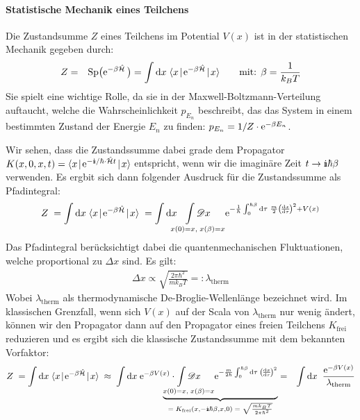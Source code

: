 \paragraph{Statistische Mechanik eines Teilchens}
Die Zustandsumme $Z$ eines Teilchens im Potential $V(x)$ ist in der statistischen Mechanik gegeben durch: 
\begin{eqnarray*}
	Z &=& \Sp\big(\e^{-\beta\hat{\ham}}\,\big) = \int \mathrm{d}x\; \bracket{x}{\e^{-\beta\hat{\ham}}}{x} \qquad \text{mit: } \beta=\frac{1}{k_BT}
\end{eqnarray*}
Sie spielt eine wichtige Rolle, da sie in der Maxwell-Boltzmann-Verteilung auftaucht, welche die Wahrscheinlichkeit $p_{E_n}$ beschreibt, das das System in einem bestimmten Zustand der Energie $E_n$ zu finden: $p_{E_n}=1/Z\cdot\mathrm{e}^{-\beta E_n}$. 

Wir sehen, dass die Zustandssumme dabei grade dem Propagator $K(x,0,x,t)=\bracket{x}{\e^{-\I/\hbar\cdot \hat{\ham}t}}{x}$ entspricht, wenn wir die imaginäre Zeit $t\to \I\hbar \beta$ verwenden. Es ergbit sich dann folgender Ausdruck für die Zustandssumme als Pfadintegral: 
\begin{eqnarray*}
	Z \;= \int\mathrm{d}x\;\bracket{x}{\e^{-\beta\hat{\ham}}}{x} \;= \int \mathrm{d}x\!\!\!\!\underset{x(0)=x,\;x(\beta)=x}{\int \mathscr{D}x} \e^{-\frac{1}{\hbar}\int_0^{\hbar\beta}\mathrm{d}\tau\; \frac{m}{2}\left(\!\frac{\mathrm{d}x}{\mathrm{d}\tau}\!\right)^2+V(x)}
\end{eqnarray*}
Das Pfadintegral berücksichtigt dabei die quantenmechanischen Fluktuationen, welche proportional zu $\Delta x$  sind. Es gilt: 
\begin{eqnarray*}
	\Delta x \propto \sqrt{\frac{2\pi \hbar^2}{m k_B T}} =: \lambda_{\text{therm}}
\end{eqnarray*}
Wobei $\lambda_{\text{therm}}$ als thermodynamische De-Broglie-Wellenlänge bezeichnet wird. Im klassischen Grenzfall, wenn sich $V(x)$ auf der Scala von $\lambda_{\text{therm}}$ nur wenig ändert, können wir den Propagator dann auf den Propagator eines freien Teilchens $K_{\text{frei}}$ reduzieren und es ergibt sich die klassische Zustandssumme mit dem bekannten Vorfaktor: 
\begin{eqnarray*}
	Z \;= \int\mathrm{d}x\;\bracket{x}{\e^{-\beta\hat{\ham}}}{x} \;\approx\; \int \mathrm{d}x\;\e^{-\beta V(x)}\cdot\!\!\!\!\!\!\!\!\! \underbrace{\underset{x(0)=x,\;x(\beta)=x}{\int \mathscr{D}x} \e^{-\frac{m}{2\hbar}\int_0^{\hbar\beta}\mathrm{d}\tau\; \left(\!\frac{\mathrm{d}x}{\mathrm{d}\tau}\!\right)^2}}_{=\; K_{\text{frei}}(x,-\I\hbar\beta,x,0)\;=\;\sqrt{\frac{mk_BT}{2\pi\hbar^2}}} &=& \int \mathrm{d}x\;\;\frac{\e^{-\beta V(x)}}{\lambda_{\text{therm}}}
\end{eqnarray*}




